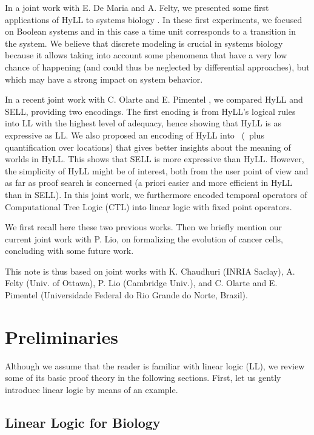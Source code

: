\documentclass{llncs}
\begin{document}
In a joint work with E. De Maria and A. Felty,
we presented some first applications of HyLL to systems biology 
\cite{deMaria-Despeyroux-Felty:14-fmmb}.  
In these first experiments, we focused on Boolean systems and 
in this case a time unit corresponds to a transition in the system.
%
We believe that discrete modeling is crucial in systems
biology because it allows taking into account some phenomena
that have a very low chance of happening (and could thus be neglected by
differential approaches), but which may have a strong impact on system
behavior.

In a recent joint work with C. Olarte and E. Pimentel
\cite{Despeyroux-Olarte-Pimentel:lsfa-16},
we compared HyLL and SELL, providing two encodings. 
The first enoding is from HyLL's logical rules into LL with the highest level 
of adequacy, hence showing that HyLL is as expressive as LL.
We also proposed an encoding of HyLL into \sellU\ 
(\sell\ plus quantification over locations) that gives better insights about 
the meaning of worlds in HyLL. 
This shows that SELL is more expressive than HyLL. 
However, the simplicity of HyLL might be of interest, 
both from the user point of view and
as far as proof search is concerned 
(a priori easier and more efficient in HyLL than in SELL).
In this joint work, we 
furthermore encoded temporal operators of Computational Tree Logic (CTL)  
into linear logic with fixed point operators.

We first recall here these two previous works.
Then we briefly mention our current joint work with P. Lio, 
on formalizing the evolution of cancer cells,
concluding with some future work.

This note is thus based on joint works with 
K. Chaudhuri (INRIA Saclay), A. Felty (Univ. of Ottawa), 
P. Lio (Cambridge Univ.), and C. Olarte and 
E. Pimentel (Universidade Federal do Rio Grande do Norte, Brazil).


\section{Preliminaries} 
% 

Although we assume that the reader is familiar with linear logic
\cite{girard87tcs} (LL), we review some of its basic proof theory in the 
following sections.
First, let us gently introduce linear logic by means of an example.

\subsection{Linear Logic for Biology}
\label{subsec:ll}
\end{document}
